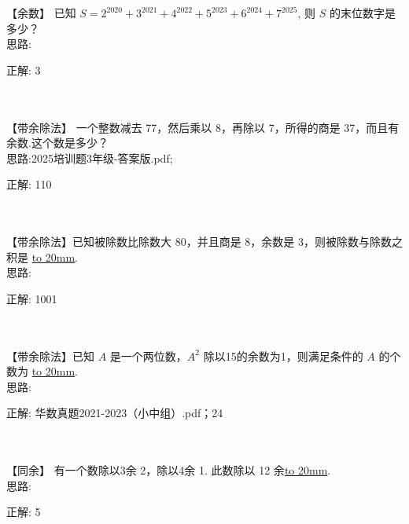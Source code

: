\item {
    【余数】
    已知 $S = 2^{2020} + 3^{2021} + 4^{2022} + 5^{2023} +6^{2024} + 7^{2025}$, 则 $S$ 的末位数字是多少？
    \ifshowSolution
        \fangsong{}
        \\
        思路:

        正解: 3
    \else
        \\ \\ \\
    \fi
}

\item {
    【带余除法】
    一个整数减去 77，然后乘以 8，再除以 7，所得的商是 37，而且有余数.这个数是多少？
    \ifshowSolution
        \fangsong{}
        \\
        思路:2025培训题3年级-答案版.pdf;

        正解:  110
    \else
        \\ \\ \\
    \fi
}

\item {
    【带余除法】已知被除数比除数大 80，并且商是 8，余数是 3，则被除数与除数之积是 \underline{\hbox to 20mm{}}.
    \ifshowSolution
        \fangsong{}
        \\
        思路:

        正解: 1001
    \else
        \\ \\ \\
    \fi
}

\item {
    【带余除法】已知 $A$ 是一个两位数，$A^2$ 除以15的余数为1，则满足条件的 $A$ 的个数为 \underline{\hbox to 20mm{}}.
    \ifshowSolution
        \fangsong{}
        \\
        思路:

        正解: 华数真题2021-2023（小中组）.pdf；24
    \else
        \\ \\ \\
    \fi
}

\item {
    【同余】
    有一个数除以3余 2，除以4余 1. 此数除以 12 余\underline{\hbox to 20mm{}}.
    \ifshowSolution
        \fangsong{}
        \\
        思路:

        正解: 5
    \else
        \\ \\ \\
    \fi
}

